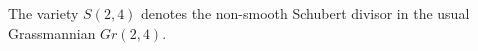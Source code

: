 \documentclass[draft]{article} %
\begin{document}
The variety $S(2,4)$ denotes the non-smooth Schubert divisor in the usual Grassmannian $Gr(2,4)$.

\end{document}
